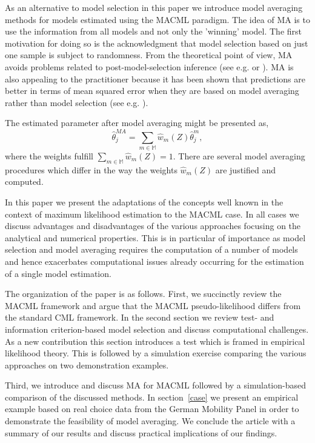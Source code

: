\documentclass[12pt, a4paper]{article}
\numberwithin{defcounter}{section}
\numberwithin{excounter}{section}
\begin{document}
As an alternative to model selection in this paper we introduce model averaging methods for models estimated using the \ac{MACML} paradigm. The idea of \ac{MA} 
is to use the information from all models and not only the 'winning' model. The first motivation for doing so is the acknowledgment that model selection based on just one sample is subject to randomness. From the theoretical point of view, \ac{MA} avoids problems related to post-model-selection inference (see e.g. \cite[206ff]{claeskens2008} or \cite{leeb2005}). \ac{MA} is also appealing to the practitioner because it has been shown that predictions are better in terms of mean squared error when they are based on model averaging rather than model selection (see e.g. \cite{gao2016}). 

The estimated parameter after model averaging might be presented as,
\begin{equation}
\hat{\theta}_j^{MA} = \sum_{m \in \mathbb{M}} \hat{w}_m(Z) \hat{\theta}_j^m,
\end{equation}
where the weights fulfill $\sum_{m \in \mathbb{M}} \hat{w}_m (Z) = 1$. %
There are several model averaging procedures which differ in the way the weights $\hat{w}_m(Z)$ are justified and computed.

In this paper we present the adaptations of the concepts well known in  the context of maximum likelihood estimation to the \ac{MACML} case. In all cases we discuss  advantages and disadvantages of the various approaches focusing on the analytical and numerical properties. This is in particular of importance as model selection and model averaging requires the computation of a number of models and hence exacerbates computational issues already occurring for the estimation of a single model estimation. 

The organization of the paper is as follows. First, we succinctly review the \ac{MACML} framework and argue that the \ac{MACML} pseudo-likelihood differs from the standard \ac{CML} framework. In the second section we review test- and information criterion-based model selection and discuss computational challenges. As a new contribution this section introduces a test which is framed in empirical likelihood theory. This is followed by a simulation exercise comparing the various approaches on two demonstration examples.

Third, we introduce and discuss \ac{MA} for \ac{MACML} followed by a simulation-based comparison of the discussed methods. 
In section~\ref{case} we present an empirical example based on real choice data from the German Mobility Panel in order to demonstrate the feasibility of model averaging. We conclude the article with a summary of our results and discuss practical implications of our findings.
\end{document}

